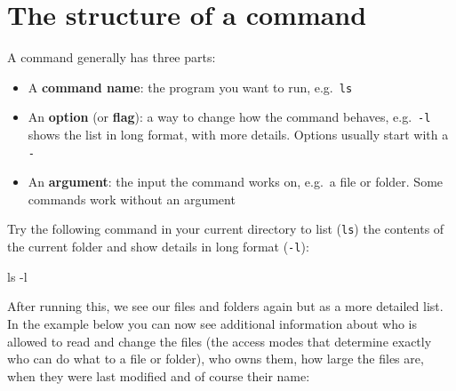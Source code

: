 \documentclass[
  letterpaper,
  DIV=11,
  numbers=noendperiod]{scrreprt}
\newenvironment{Shaded}{}{}
\newcommand{\AttributeTok}[1]{\textcolor[rgb]{0.84,0.23,0.29}{#1}}
\newcommand{\FunctionTok}[1]{\textcolor[rgb]{0.44,0.26,0.76}{#1}}
\providecommand{\tightlist}{%
  \setlength{\itemsep}{0pt}\setlength{\parskip}{0pt}}
\begin{document}
\section{The structure of a command}\label{the-structure-of-a-command}

A command generally has three parts:

\begin{itemize}
\tightlist
\item
  A \textbf{command name}: the program you want to run, e.g.~\texttt{ls}
\item
  An \textbf{option} (or \textbf{flag}): a way to change how the command
  behaves, e.g.~\texttt{-l} shows the list in long format, with more
  details. Options usually start with a \texttt{-}
\item
  An \textbf{argument}: the input the command works on, e.g.~a file or
  folder. Some commands work without an argument
\end{itemize}

Try the following command in your current directory to list
(\texttt{ls}) the contents of the current folder and show details in
long format (\texttt{-l}):

\begin{Shaded}
\begin{Highlighting}[]
\FunctionTok{ls} \AttributeTok{{-}l}
\end{Highlighting}
\end{Shaded}

After running this, we see our files and folders again but as a more
detailed list. In the example below you can now see additional
information about who is allowed to read and change the files (the
access modes that determine exactly who can do what to a file or
folder), who owns them, how large the files are, when they were last
modified and of course their name:
\end{document}
